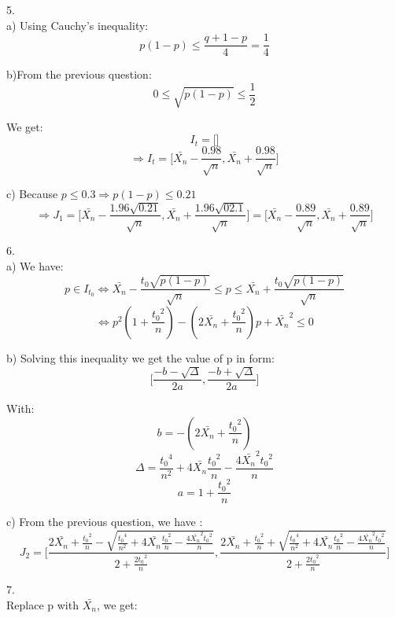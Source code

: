 \documentclass[10pt]{article}
\newenvironment{problem}[2][Problem]{\begin{trivlist}
\item[\hskip \labelsep {\bfseries #1}\hskip \labelsep {\bfseries #2.}]}{\end{trivlist}}
\begin{document}
\begin{problem}{3}
\item 5. \\

a) Using Cauchy's inequality: \\
\[p(1-p) \leqslant \frac{q+1-p}{4}=\frac{1}{4}\]

b)From the previous question: \\
\[0 \leqslant\sqrt{p(1-p)} \leqslant \frac{1}{2}\]

We get: \\
\[I_t=\Big[ \Big]\]
\[\Rightarrow I_t=\Big[ \bar{X_n}-\frac{0.98}{\sqrt{n}},\bar{X_n}+\frac{0.98}{\sqrt{n}} \Big]\]

c) Because $p \leqslant 0.3 \Rightarrow p(1-p) \leqslant 0.21$
\[\Rightarrow J_1=\Big[ \bar{X_n}-\frac{1.96\sqrt{0.21}}{\sqrt{n}},\bar{X_n}+\frac{1.96\sqrt{02.1}}{\sqrt{n}} \Big]= \Big[ \bar{X_n}-\frac{0.89}{\sqrt{n}},\bar{X_n}+\frac{0.89}{\sqrt{n}} \Big]\]

\item 6. \\

a) We have:\\
\[ p \in I_{t_0} \Longleftrightarrow  \bar{X_n}-\frac{t_0\sqrt{p(1-p)}}{\sqrt{n}}\leqslant p \leqslant\bar{X_n}+\frac{t_0\sqrt{p(1-p)}}{\sqrt{n}} \]
\[\Longleftrightarrow p^2(1+\frac{{t_0}^2}{n})-(2\bar{X_n}+\frac{{t_0}^2}{n})p+{\bar{X_n}}^2 \leqslant 0\]

b) Solving this inequality we get the value of p in form:\\
\[\Big[\frac{-b-\sqrt{\Delta}}{2a},\frac{-b+\sqrt{\Delta}}{2a}\Big] \]

With:
\[b=-(2\bar{X_n}+\frac{{t_0}^2}{n})\]
\[\Delta=\frac{{t_0}^4}{n^2}+4\bar{X_n}\frac{{t_0}^2}{n}-\frac{4\bar{X_n}^2{t_0}^2}{n}\]
\[a=1+\frac{{t_0}^2}{n}\]

c) From the previous question, we have : \\

\[J_2= \Big[\frac{2\bar{X_n}+\frac{{t_0}^2}{n}-\sqrt{\frac{{t_0}^4}{n^2}+4\bar{X_n}\frac{{t_0}^2}{n}-\frac{4\bar{X_n}^2{t_0}^2}{n}}}{2+\frac{2{t_0}^2}{n}}, \frac{2\bar{X_n}+\frac{{t_0}^2}{n}+\sqrt{\frac{{t_0}^4}{n^2}+4\bar{X_n}\frac{{t_0}^2}{n}-\frac{4\bar{X_n}^2{t_0}^2}{n}}}{2+\frac{2{t_0}^2}{n}}\Big]\]




\item 7. \\

Replace p with $\bar{X_n}$, we get: \\


\end{problem}
\end{document}
